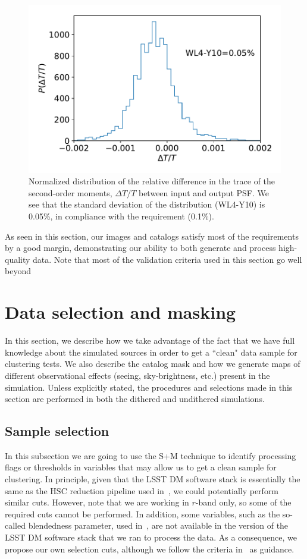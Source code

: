 \documentclass[a4paper,fleqn,usenatbib]{mnras}
\begin{document}
\begin{figure}
\centering
\includegraphics[width=0.85\columnwidth]{WL4-Y10}
\caption{Normalized distribution of the relative difference in the trace of the second-order moments, $\Delta T/T$ between input and output PSF. We see that the standard deviation of the distribution (WL4-Y10) is 0.05\%, in compliance with the requirement (0.1\%).}
\label{fig:WL4-Y10}
\end{figure}

As seen in this section, our images and catalogs satisfy most of the requirements by a good margin, demonstrating our ability to both generate and process high-quality data. Note that most of the validation criteria used in this section go well beyond 

\section{Data selection and masking}
\label{sec:data_selection}
In this section, we describe how we take advantage of the fact that we have full knowledge about the simulated sources in order to get a ``clean" data sample for clustering tests. We also describe the catalog mask and how we generate maps of different observational effects (seeing, sky-brightness, etc.) present in the simulation. Unless explicitly stated, the procedures and selections made in this section are performed in both the dithered and undithered simulations.

\subsection{Sample selection}
\label{ssec:sample_selection}

In this subsection we are going to use the \textsf{S+M} technique to identify processing flags or thresholds in variables that may allow us to get a clean sample for clustering. In principle, given that the LSST DM software stack is essentially the same as the HSC reduction pipeline used in~\citet{2018PASJ...70S..25M}, we could potentially perform similar cuts. However, note that we are working in $r$-band only, so some of the required cuts cannot be performed. In addition, some variables, such as the so-called blendedness parameter, used in~\citet{2018PASJ...70S..25M}, are not available in the version of the LSST DM software stack that we ran to process the data. As a consequence, we propose our own selection cuts, although we follow the criteria in~\citet{2018PASJ...70S..25M} as guidance.
\end{document}
